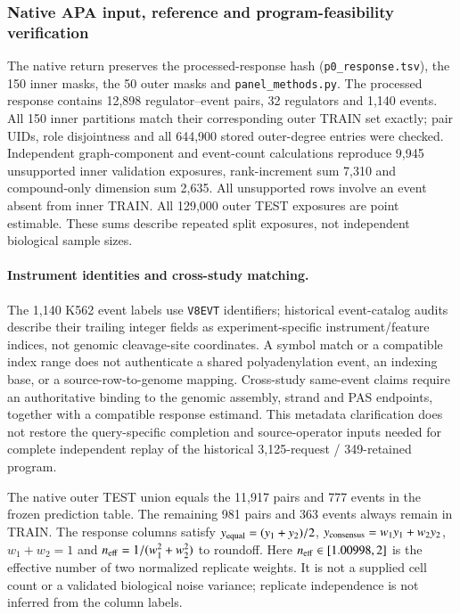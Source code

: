 \documentclass[11pt]{article}
\begin{document}
\subsubsection{Native APA input, reference and program-feasibility verification}
The native return preserves the processed-response hash (\texttt{p0\_response.tsv}), the 150 inner masks, the 50 outer masks and \texttt{panel\_methods.py}. The processed response contains 12,898 regulator--event pairs, 32 regulators and 1,140 events. All 150 inner partitions match their corresponding outer TRAIN set exactly; pair UIDs, role disjointness and all 644,900 stored outer-degree entries were checked. Independent graph-component and event-count calculations reproduce 9,945 unsupported inner validation exposures, rank-increment sum 7,310 and compound-only dimension sum 2,635. All unsupported rows involve an event absent from inner TRAIN. All 129,000 outer TEST exposures are point estimable. These sums describe repeated split exposures, not independent biological sample sizes.

\paragraph{Instrument identities and cross-study matching.}
The 1,140 K562 event labels use \texttt{V8EVT} identifiers; historical event-catalog audits describe their trailing integer fields as experiment-specific instrument/feature indices, not genomic cleavage-site coordinates. A symbol match or a compatible index range does not authenticate a shared polyadenylation event, an indexing base, or a source-row-to-genome mapping. Cross-study same-event claims require an authoritative binding to the genomic assembly, strand and PAS endpoints, together with a compatible response estimand. This metadata clarification does not restore the query-specific completion and source-operator inputs needed for complete independent replay of the historical 3,125-request / 349-retained program.


The native outer TEST union equals the 11,917 pairs and 777 events in the frozen prediction table. The remaining 981 pairs and 363 events always remain in TRAIN. The response columns satisfy $y_{\rm equal}=(y_1+y_2)/2$, $y_{\rm consensus}=w_1y_1+w_2y_2$, $w_1+w_2=1$ and $n_{\rm eff}=1/(w_1^2+w_2^2)$ to roundoff. Here $n_{\rm eff}\in[1.00998,2]$ is the effective number of two normalized replicate weights. It is not a supplied cell count or a validated biological noise variance; replicate independence is not inferred from the column labels.
\end{document}
